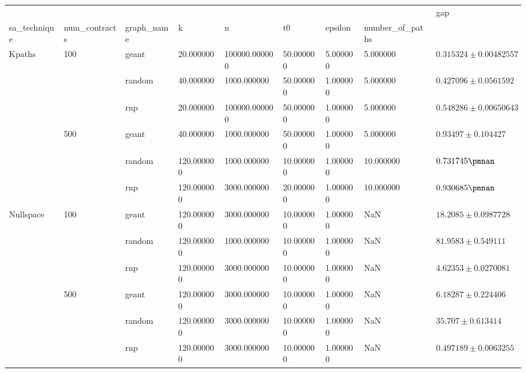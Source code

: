 \begin{tabular}{lllllllll}
\toprule
 &  &  &  &  &  &  &  & gap \\
sa_technique & num_contracts & graph_name & k & n & t0 & epsilon & number_of_paths &  \\
\midrule
\multirow[t]{6}{*}{Kpaths} & \multirow[t]{3}{*}{100} & geant & 20.000000 & 100000.000000 & 50.000000 & 5.000000 & 5.000000 & $0.315324\pm0.00482557$ \\
\cline{3-9} \cline{4-9} \cline{5-9} \cline{6-9} \cline{7-9}
 &  & random & 40.000000 & 1000.000000 & 50.000000 & 1.000000 & 5.000000 & $0.427096\pm0.0561592$ \\
\cline{3-9} \cline{4-9} \cline{5-9} \cline{6-9} \cline{7-9}
 &  & rnp & 20.000000 & 100000.000000 & 50.000000 & 1.000000 & 5.000000 & $0.548286\pm0.00650643$ \\
\cline{2-9} \cline{3-9} \cline{4-9} \cline{5-9} \cline{6-9} \cline{7-9}
 & \multirow[t]{3}{*}{500} & geant & 40.000000 & 1000.000000 & 50.000000 & 1.000000 & 5.000000 & $0.93497\pm0.104427$ \\
\cline{3-9} \cline{4-9} \cline{5-9} \cline{6-9} \cline{7-9}
 &  & random & 120.000000 & 1000.000000 & 10.000000 & 1.000000 & 10.000000 & $0.731745\pmnan$ \\
\cline{3-9} \cline{4-9} \cline{5-9} \cline{6-9} \cline{7-9}
 &  & rnp & 120.000000 & 3000.000000 & 20.000000 & 1.000000 & 10.000000 & $0.930685\pmnan$ \\
\cline{1-9} \cline{2-9} \cline{3-9} \cline{4-9} \cline{5-9} \cline{6-9} \cline{7-9}
\multirow[t]{6}{*}{Nullspace} & \multirow[t]{3}{*}{100} & geant & 120.000000 & 3000.000000 & 10.000000 & 1.000000 & NaN & $18.2085\pm0.0987728$ \\
\cline{3-9} \cline{4-9} \cline{5-9} \cline{6-9} \cline{7-9}
 &  & random & 120.000000 & 1000.000000 & 10.000000 & 1.000000 & NaN & $81.9583\pm0.549111$ \\
\cline{3-9} \cline{4-9} \cline{5-9} \cline{6-9} \cline{7-9}
 &  & rnp & 120.000000 & 3000.000000 & 10.000000 & 1.000000 & NaN & $4.62353\pm0.0270081$ \\
\cline{2-9} \cline{3-9} \cline{4-9} \cline{5-9} \cline{6-9} \cline{7-9}
 & \multirow[t]{3}{*}{500} & geant & 120.000000 & 3000.000000 & 10.000000 & 1.000000 & NaN & $6.18287\pm0.224406$ \\
\cline{3-9} \cline{4-9} \cline{5-9} \cline{6-9} \cline{7-9}
 &  & random & 120.000000 & 3000.000000 & 10.000000 & 1.000000 & NaN & $35.707\pm0.613414$ \\
\cline{3-9} \cline{4-9} \cline{5-9} \cline{6-9} \cline{7-9}
 &  & rnp & 120.000000 & 3000.000000 & 10.000000 & 1.000000 & NaN & $0.497189\pm0.0063255$ \\
\cline{1-9} \cline{2-9} \cline{3-9} \cline{4-9} \cline{5-9} \cline{6-9} \cline{7-9}
\bottomrule
\end{tabular}
